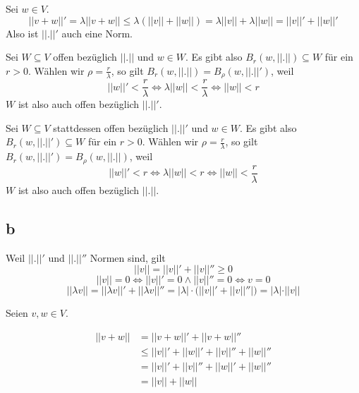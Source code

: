 \documentclass[10pt,a4paper]{article}
\begin{document}
Sei $w \in V$.
\begin{equation}
||v + w||' = \lambda ||v + w|| \le \lambda (||v|| + ||w||) = \lambda ||v|| + \lambda ||w|| = ||v||' + ||w||'
\end{equation}
Also ist $||.||'$ auch eine Norm.

Sei $W \subseteq V$ offen bezüglich $||.||$ und $w \in W$.
Es gibt also $B_{r}(w, ||.||) \subseteq W$ für ein $r > 0$.
Wählen wir $\rho = \frac{r}{\lambda}$, so gilt $B_{r}(w, ||.||) = B_{\rho}(w, ||.||')$, weil
\begin{equation}
||w||' < \frac{r}{\lambda} \Leftrightarrow \lambda ||w|| < \frac{r}{\lambda} \Leftrightarrow ||w|| < r
\end{equation}
$W$ ist also auch offen bezüglich $||.||'$.

Sei $W \subseteq V$ stattdessen offen bezüglich $||.||'$ und $w \in W$.
Es gibt also $B_{r}(w, ||.||') \subseteq W$ für ein $r > 0$.
Wählen wir $\rho = \frac{r}{\lambda}$, so gilt $B_{r}(w, ||.||') = B_{\rho}(w, ||.||)$, weil
\begin{equation}
||w||' < r \Leftrightarrow \lambda ||w|| < r \Leftrightarrow ||w|| < \frac{r}{\lambda}
\end{equation}
$W$ ist also auch offen bezüglich $||.||$.

\subsection*{b}

Weil $||.||'$ und $||.||''$ Normen sind, gilt
\begin{equation}
||v|| = ||v||' + ||v||'' \ge 0
\end{equation}
\begin{equation}
||v|| = 0 \Leftrightarrow ||v||' = 0 \land ||v||'' = 0 \Leftrightarrow v = 0
\end{equation}
\begin{equation}
||\lambda v|| = ||\lambda v||' + ||\lambda v||'' = |\lambda| \cdot (||v||' + ||v||''|) = |\lambda| \cdot ||v||
\end{equation}

Seien $v, w \in V$.

\begin{align}
||v + w||&  = ||v + w||' + ||v + w||''\\
& \le ||v||' + ||w||' + ||v||'' + ||w||''\\
& = ||v||' + ||v||'' + ||w||' + ||w||''\\
& = ||v|| + ||w||
\end{align}
\end{document}
